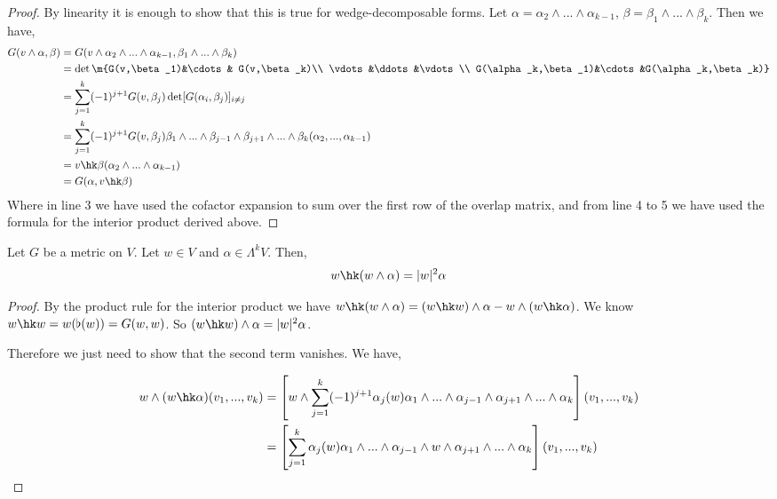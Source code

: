\begin{proof}
    By linearity it is enough to show that this is true for wedge-decomposable forms. Let $\alpha = \alpha_2\wedge...\wedge \alpha_{k-1}$, $\beta = \beta_1\wedge...\wedge \beta_k$. Then we have,
    \begin{align*}
        G(v\wedge\alpha,\beta) &= G(v\wedge\alpha_2\wedge...\wedge \alpha_{k-1},\beta_1\wedge...\wedge \beta_{k})\\
        &= \det\m{G(v,\beta_1)&\cdots & G(v,\beta_k)\\
        \vdots &\ddots&\vdots\\
        G(\alpha_k,\beta_1)&\cdots&G(\alpha_k,\beta_k)}\\
        &= \sum_{j=1}^k (-1)^{j+1}G(v,\beta_j)\det [G(\alpha_i,\beta_j)]_{i\neq j}\\
        &=\sum_{j=1}^k (-1)^{j+1}G(v,\beta_j)\beta_1\wedge...\wedge\beta_{j-1}\wedge\beta_{j+1}\wedge...\wedge\beta_k(\alpha_2,...,\alpha_{k-1})\\
        &=v\hk\beta(\alpha_2\wedge...\wedge\alpha_{k-1})\\
        &= G(\alpha,v\hk\beta)
    \end{align*}
    Where in line 3 we have used the cofactor expansion to sum over the first row of the overlap matrix, and from line 4 to 5 we have used the formula for the interior product derived above.
\end{proof}
\begin{lemma}
Let $G$ be a metric on $V$.
Let $w\in V$ and $\alpha\in \Lambda^k V$. Then,
\begin{equation}
    w\hk (w\wedge\alpha) = |w|^2\alpha
\end{equation}
\label{lemma:15.2}
\end{lemma}
\begin{proof}
    By the product rule for the interior product we have $w\hk(w\wedge \alpha) = (w\hk w)\wedge\alpha - w\wedge(w\hk\alpha)$. We know $w\hk w = w(\flat(w)) = G(w,w)$. So $(w\hk w)\wedge \alpha = |w|^2\alpha$.
    
    
    Therefore we just need to show that the second term vanishes. We have,
    
    \begin{align*}w\wedge(w\hk\alpha)(v_1,...,v_{k})&=\left[w\wedge \sum_{j=1}^k (-1)^{j+1}\alpha_j(w) \alpha_1\wedge...\wedge\alpha_{j-1}\wedge\alpha_{j+1}\wedge...\wedge\alpha_k\right](v_1,...,v_{k})\\
    &=\left[\sum_{j=1}^k \alpha_j(w) \alpha_1\wedge...\wedge\alpha_{j-1}\wedge w\wedge \alpha_{j+1}\wedge...\wedge\alpha_k\right](v_1,...,v_{k})\end{align*}
\end{proof}
